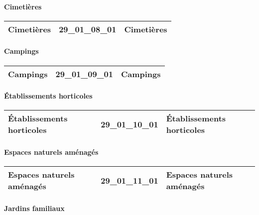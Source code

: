 \documentclass[12pt,titlepage]{book}
\begin{document}
\paragraph{Cimetières}
\noindent
\vspace{\baselineskip}

\renewcommand{\arraystretch}{1.2}
\begin{supertabular}{|p{10cm}|c|p{15cm}|}
 Cimetières & 29\_01\_08\_01 & Cimetières\\
\hline
\end{supertabular}


\paragraph{Campings}
\noindent
\vspace{\baselineskip}

\renewcommand{\arraystretch}{1.2}
\begin{supertabular}{|p{10cm}|c|p{15cm}|}
 Campings & 29\_01\_09\_01 & Campings\\
\hline
\end{supertabular}


\paragraph{Établissements horticoles}
\noindent
\vspace{\baselineskip}

\renewcommand{\arraystretch}{1.2}
\begin{supertabular}{|p{10cm}|c|p{15cm}|}
 Établissements horticoles & 29\_01\_10\_01 & Établissements horticoles\\
\hline
\end{supertabular}


\paragraph{Espaces naturels aménagés}
\noindent
\vspace{\baselineskip}

\renewcommand{\arraystretch}{1.2}
\begin{supertabular}{|p{10cm}|c|p{15cm}|}
 Espaces naturels aménagés & 29\_01\_11\_01 & Espaces naturels aménagés\\
\hline
\end{supertabular}


\paragraph{Jardins familiaux}
\noindent
\vspace{\baselineskip}
\end{document}
